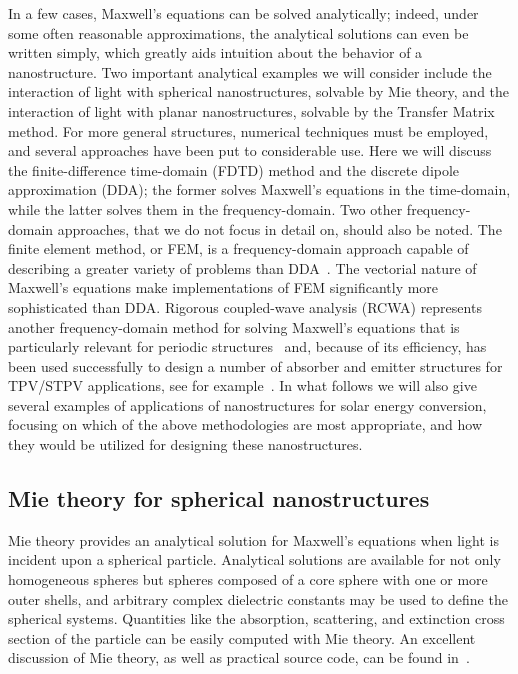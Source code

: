 \documentclass[10pt,letterpaper]{article}
\begin{document}
In a few cases, Maxwell's equations  can be solved analytically; indeed, under some often
reasonable approximations, the analytical solutions can even be written simply, which
greatly aids intuition about the behavior of a nanostructure.  Two important analytical examples we will
consider include the interaction of light with spherical nanostructures, solvable by Mie
theory, and the interaction of light with planar nanostructures, solvable by the Transfer
Matrix method.   For more general structures, numerical techniques must be employed, and
several approaches have been put to considerable use.  Here we will
discuss the finite-difference time-domain (FDTD) method and the discrete dipole
approximation (DDA); the former solves Maxwell's equations in the time-domain, while the 
latter
solves them in the frequency-domain. Two other frequency-domain approaches, that
we do not focus in detail on, should also be noted.  The finite element method, or FEM, is a  
frequency-domain approach capable of describing a greater variety of 
problems than DDA~\cite{fem}.
The vectorial
nature of Maxwell's equations make
implementations of FEM significantly more sophisticated than DDA.  Rigorous coupled-wave analysis (RCWA) represents
another frequency-domain method for solving Maxwell's equations that is 
particularly relevant for periodic structures~\cite{RCWA1,RCWA2} and, 
because of its efficiency, has been used successfully to design a number of
absorber and emitter structures for TPV/STPV applications, 
see for example~\cite{A13, RCWA3}.  In what follows we will also give several
examples of applications of nanostructures for
solar energy conversion, focusing on which of the above methodologies are most
appropriate, and how they would be utilized for designing these nanostructures.

\subsection{Mie theory for spherical nanostructures}
Mie theory provides an analytical solution for Maxwell's equations when light is incident
upon a spherical particle. Analytical solutions are available for not only
homogeneous spheres but spheres composed of a core sphere with one or more outer shells, and
arbitrary complex dielectric constants may be used to define the spherical systems.   
Quantities like the absorption, scattering, and extinction cross section of the particle
can be easily computed with Mie theory. 
An excellent
discussion of Mie theory, as well as practical source code, can be found in~\cite{Bohren}.
\end{document}
